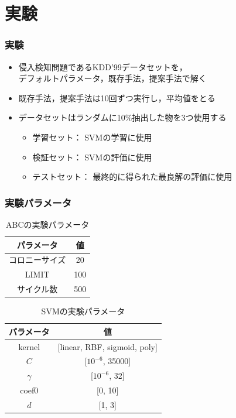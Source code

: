 \documentclass[11pt,dvipdfmx,cjk]{beamer}
\begin{document}
\section{実験}
\begin{frame}
  \frametitle{実験}
  \begin{itemize}
    \item 侵入検知問題であるKDD'99データセットを，\\デフォルトパラメータ，既存手法，提案手法で解く
   　\item 既存手法，提案手法は10回ずつ実行し，平均値をとる
    \item データセットはランダムに10\%抽出した物を3つ使用する
    \begin{itemize}
      \item 学習セット： SVMの学習に使用
      \item 検証セット： SVMの評価に使用
      \item テストセット： 最終的に得られた最良解の評価に使用
    \end{itemize}
    
  \end{itemize}
\end{frame}
\begin{frame}
  \frametitle{実験パラメータ}
  \begin{table}[tb]
    \scriptsize
    \centering
    \caption{ABCの実験パラメータ}  %
    \begin{tabular}{|c|c|}  %
        \hline  %
        パラメータ & 値 \\  %
        \hline  %
        コロニーサイズ & 20 \\  %
        \hline  %
        LIMIT & 100 \\  %
        \hline  %
        サイクル数 & 500 \\  %
        \hline  %
    \end{tabular}
    \label{tab:abc_parameters}  %
\end{table}

\begin{table}[tb]
  \scriptsize
    \centering
    \caption{SVMの実験パラメータ}  %
    \begin{tabular}{|c|c|}  %
        \hline  %
        パラメータ & 値 \\  %
        \hline  %
        kernel & [linear, RBF, sigmoid, poly] \\  %
        \hline  %
        $C$ & [$10^{-6}$, 35000] \\  %
        \hline  %
        $\gamma$ & [$10^{-6}$, 32] \\  %
        \hline  %
        coef0 & [0, 10] \\  %
        \hline  %
        $d$ & [1, 3] \\  %
        \hline  %
    \end{tabular}
    \label{tab:svm_parameters}  %
\end{table}

\end{frame}
\end{document}
